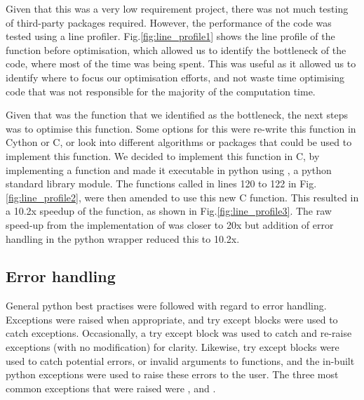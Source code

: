     Given that this was a very low requirement project, there was not much testing of third-party packages required.
    However, the performance of the code was tested using a line profiler.
    Fig.\eqref{fig:line_profile1} shows the line profile of the  function before
    optimisation, which allowed us to identify the bottleneck of the code, where most of the time was being spent.
    This was useful as it allowed us to identify where to focus our optimisation efforts, and not waste time optimising
    code that was not responsible for the majority of the computation time.

    Given that  was the function that we identified as the
    bottleneck, the next steps was to optimise this function.
    Some options for this were re-write this function in Cython or C, or look into different algorithms or packages
    that could be used to implement this function.
    We decided to implement this function in C, by implementing a function  and made
    it executable in python using , a python standard library module.
    The functions called in lines 120 to 122 in Fig.\eqref{fig:line_profile2}, were then amended to use this new C function.
    This resulted in a 10.2x speedup of the  function, as shown in Fig.\eqref{fig:line_profile3}.
    The raw speed-up from the implementation of  was closer to 20x but addition of
    error handling in the python wrapper reduced this to 10.2x.

    \subsection{Error handling}\label{subsec:coding-best-practises}
    General python best practises were followed with regard to error handling.
    Exceptions were raised when appropriate, and try except blocks were used to catch exceptions.
    Occasionally, a try except block was used to catch and re-raise exceptions (with no modification) for clarity.
    Likewise, try except blocks were used to catch potential errors, or invalid arguments to functions, and the in-built
    python exceptions were used to raise these errors to the user.
    The three most common exceptions that were raised were ,  and
    .

